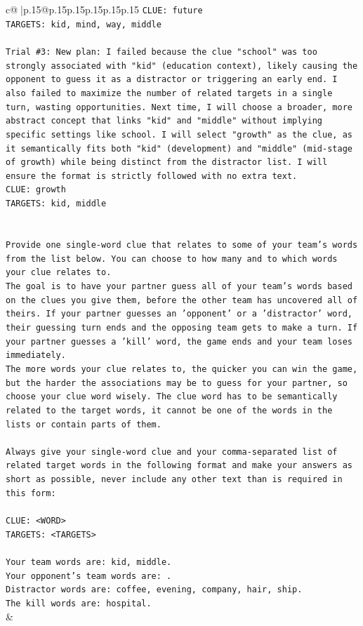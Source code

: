 \documentclass{article}
\begin{document}
{\begin{supertabular}{c@{$\;$}|p{.15\linewidth}@{}p{.15\linewidth}p{.15\linewidth}p{.15\linewidth}p{.15\linewidth}p{.15\linewidth}}
{{{\texttt{CLUE: future} \\
\texttt{TARGETS: kid, mind, way, middle} \\
\\ 
\texttt{Trial \#3: New plan: I failed because the clue "school" was too strongly associated with "kid" (education context), likely causing the opponent to guess it as a distractor or triggering an early end. I also failed to maximize the number of related targets in a single turn, wasting opportunities. Next time, I will choose a broader, more abstract concept that links "kid" and "middle" without implying specific settings like school. I will select "growth" as the clue, as it semantically fits both "kid" (development) and "middle" (mid{-}stage of growth) while being distinct from the distractor list. I will ensure the format is strictly followed with no extra text.} \\
\texttt{CLUE: growth} \\
\texttt{TARGETS: kid, middle} \\
\\ 
\\ 
\texttt{Provide one single{-}word clue that relates to some of your team's words from the list below. You can choose to how many and to which words your clue relates to.} \\
\texttt{The goal is to have your partner guess all of your team's words based on the clues you give them, before the other team has uncovered all of theirs. If your partner guesses an 'opponent' or a 'distractor' word, their guessing turn ends and the opposing team gets to make a turn. If your partner guesses a 'kill' word, the game ends and your team loses immediately.} \\
\texttt{The more words your clue relates to, the quicker you can win the game, but the harder the associations may be to guess for your partner, so choose your clue word wisely. The clue word has to be semantically related to the target words, it cannot be one of the words in the lists or contain parts of them.} \\
\\ 
\texttt{Always give your single{-}word clue and your comma{-}separated list of related target words in the following format and make your answers as short as possible, never include any other text than is required in this form:} \\
\\ 
\texttt{CLUE: <WORD>} \\
\texttt{TARGETS: <TARGETS>} \\
\\ 
\texttt{Your team words are: kid, middle.} \\
\texttt{Your opponent's team words are: .} \\
\texttt{Distractor words are: coffee, evening, company, hair, ship.} \\
\texttt{The kill words are: hospital.} \\
            }
        }
    }
    & \\ \\


\end{supertabular}}
\end{document}
